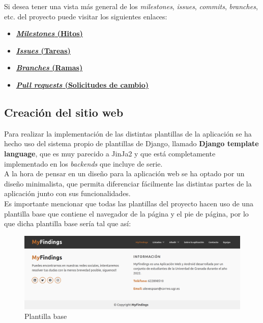 Si desea tener una vista más general de los \textit{milestones}, \textit{issues},
\textit{commits}, \textit{branches}, etc. del proyecto puede visitar los siguientes enlaces:

\begin{itemize}
    \item \textbf{\href{https://github.com/alexespana/TFG/milestones}{\textit{Milestones} (Hitos)}}
    \item \textbf{\href{https://github.com/alexespana/TFG/issues}{\textit{Issues} (Tareas)}}
    \item \textbf{\href{https://github.com/alexespana/TFG/branches}{\textit{Branches} (Ramas)}}
    \item \textbf{\href{https://github.com/alexespana/TFG/pulls}{\textit{Pull requests} (Solicitudes
    de cambio)}}
\end{itemize}


\subsection{Creación del sitio web}
Para realizar la implementación de las distintas plantillas de la aplicación se ha hecho
uso del sistema propio de plantillas de Django, llamado \textbf{Django template language},
que es muy parecido a JinJa2 y que está completamente implementado en los \textit{backends}
que incluye de serie.\\

A la hora de pensar en un diseño para la aplicación web se ha optado por un diseño
minimalista, que permita diferenciar fácilmente las distintas partes de la aplicación
junto con sus funcionalidades.\\

Es importante mencionar que todas las plantillas del proyecto hacen uso de una plantilla
base que contiene el navegador de la página y el pie de página, por lo que dicha plantilla base
sería tal que así:\\

    \begin{figure}[H]
        \centering
        \includegraphics[scale=0.25]{imagenes/base.png}
        \caption{Plantilla base}
        \label{fig:base}
    \end{figure}

